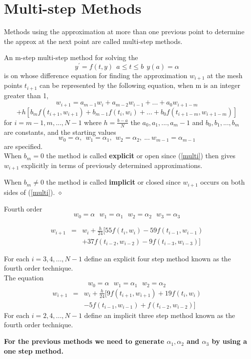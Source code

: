 
\chapter{Multi-step Methods}
Methods using the approximation at more than one previous point to determine the
approx at the next point are called multi-step methods.
\begin{definition}
An m-step multi-step method for solving the 
\[y^{'} = f(t,y) \ \ a\leq t \leq b \ \ y(a) =\alpha\]
is on whose difference equation for finding the approximation $w_{i+1}$ at the
mesh points $t_{i+1}$ can be represented by the following equation, when m is
an integer greater than 1,
\[w_{i+1}  =  a_{m-1}w_i +a_{m-2}w_{i-1} + ... + a_{0}w_{i+1-m}\]
\begin{equation}
\label{multi}
+h[b_{m}f(t_{i+1},w_{i+1}) + b_{m-1}f(t_{i},w_{i}) +...+ b_{0}f(t_{i+1-m},w_{i+1-m}) ]
\end{equation}
for $i=m-1,m,...,N-1$ where $h=\frac{b-a}{N}$ the $a_0,a_1,...,a_m-1$ and $b_0,b_1,...,b_m$
are constants, and the starting values 
\[ w_0=\alpha, \ \ w_1=\alpha_1, \ \ w_2=\alpha_2, \ ... \ w_{m-1}=\alpha_{m-1} \] 
are specified.\\
When $b_m=0$ the method is called \textbf{explicit} or open since (\ref{multi}) then gives
$w_{i+1}$ explicitly in terms of previously determined approximations.

When $b_m\not=0$ the method is called \textbf{implicit} or closed since $w_{i+1}$ occurs on both sides of (\ref{multi}). 
$\diamond$
\end{definition}
\begin{example}
Fourth order 
\[w_0=\alpha \ \ \ w_1=\alpha_1 \ \ \ w_2 = \alpha_2 \ \ \ w_3 = \alpha_3 \]

\begin{eqnarray*}
w_{i+1} &=& w_i +  \frac{h}{24}[55f(t_i,w_i)-59f(t_{i-1},w_{i-1})\\
& & +  37f(t_{i-2},w_{i-2})-9f(t_{i-3},w_{i-3})]
\end{eqnarray*}

For each $i=3,4,...,N-1$ define an explicit four step method known as the fourth
order  technique.\\
The equation
\[w_0=\alpha \ \ \ w_1=\alpha_1 \ \ \ w_2 = \alpha_2  \]
\begin{eqnarray*}w_{i+1} &=& w_i + \frac{h}{24}[9f(t_{i+1},w_{i+1})+19f(t_{i},w_{i})\\
& &-5f(t_{i-1},w_{i-1})+f(t_{i-2},w_{i-2})]\end{eqnarray*}
For each $i=2,4,...,N-1$ define an implicit three step method known as the fourth
order  technique.
\end{example}
\textbf{For the previous methods we need to generate $\alpha_1,\alpha_2$ and $\alpha_3$ by using a one step method.}
